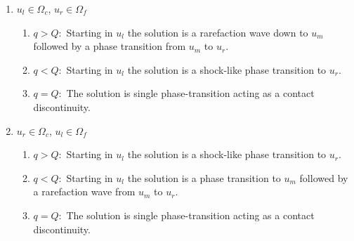 \documentclass[10pt]{article}
\numberwithin{equation}{section}
\begin{document}
\begin{enumerate}
\item $u_l \in \Omega_c$, $u_r \in \Omega_f$ \newline
\newline
  \begin{minipage}[t]{0.4\linewidth}
    \begin{enumerate}
    \item $q > Q:$ Starting in $u_l$ the solution is a rarefaction wave down to $u_m$ followed by a phase transition  from $u_m$ to $u_r$.
    \item $q < Q:$ Starting in $u_l$ the solution is a shock-like phase transition to $u_r$.
    \item $q = Q:$ The solution is single phase-transition acting as a contact discontinuity.
    \end{enumerate}
  \end{minipage}
  \begin{minipage}[t]{0.5\linewidth}
    \centering
    \strut\vspace*{-\baselineskip}\newline
  \end{minipage}
\item $u_r \in \Omega_c$, $u_l \in \Omega_f$ \newline
\newline
  \begin{minipage}[t]{0.4\linewidth}
    \begin{enumerate}
    \item $q > Q:$ Starting in $u_l$ the solution is a shock-like phase transition to $u_r$.
    \item $q < Q:$ Starting in $u_l$ the solution is a phase transition to $u_m$ followed by a rarefaction wave from $u_m$ to $u_r$.
    \item $q = Q:$ The solution is single phase-transition acting as a contact discontinuity.
    \end{enumerate}
  \end{minipage}
  \begin{minipage}[t]{0.5\linewidth}
    \centering
    \strut\vspace*{-\baselineskip}\newline
  \end{minipage}
  


\end{enumerate}
\end{document}
